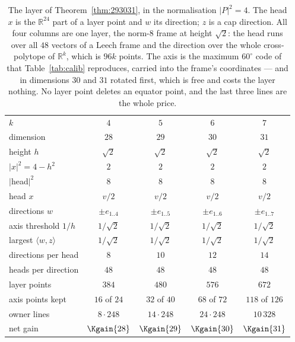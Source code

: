 \documentclass[11pt]{amsart}
\theoremstyle{remark}
\newcommand{\ip}[2]{\langle #1,#2\rangle}
\newcommand{\R}{\mathbb{R}}
\begin{document}
\begin{table}[ht]
\caption{The layer of Theorem~\ref{thm:293031}, in the normalisation
$|P|^{2}=4$. The head $x$ is the $\R^{24}$ part of a layer point and $w$ its
direction; $z$ is a cap direction. All four columns are one layer, the norm-$8$
frame at height $\sqrt2$: the head runs over all $48$ vectors of a Leech frame
and the direction over the whole cross-polytope of $\R^{k}$, which is $96k$
points. The axis is the maximum $60^{\circ}$ code of \cite{ma-etal2025} that
Table~\ref{tab:calib} reproduces, carried into the frame's coordinates --- and in
dimensions $30$ and $31$ rotated first, which is free and costs the layer
nothing. No layer point deletes an equator point, and the last three lines are
the whole price.}
\label{tab:layers}
\small\setlength{\tabcolsep}{5pt}
\begin{tabular}{lcccc}
\toprule
$k$ & $4$ & $5$ & $6$ & $7$\\
dimension & $28$ & $29$ & $30$ & $31$\\
\midrule
height $h$ & $\sqrt2$ & $\sqrt2$ & $\sqrt2$ & $\sqrt2$\\
$|x|^{2}=4-h^{2}$ & $2$ & $2$ & $2$ & $2$\\
$|$head$|^{2}$ & $8$ & $8$ & $8$ & $8$\\
head $x$ & $v/2$ & $v/2$ & $v/2$ & $v/2$\\
directions $w$ & $\pm e_{1..4}$ & $\pm e_{1..5}$ & $\pm e_{1..6}$ & $\pm e_{1..7}$\\
axis threshold $1/h$ & $1/\sqrt2$ & $1/\sqrt2$ & $1/\sqrt2$ & $1/\sqrt2$\\
largest $\ip{w}{z}$ & $1/\sqrt2$ & $1/\sqrt2$ & $1/\sqrt2$ & $1/\sqrt2$\\
directions per head & $8$ & $10$ & $12$ & $14$\\
heads per direction & $48$ & $48$ & $48$ & $48$\\
layer points & $384$ & $480$ & $576$ & $672$\\
\midrule
axis points kept & $16$ of $24$ & $32$ of $40$ & $68$ of $72$ & $118$ of $126$\\
owner lines & $8\cdot248$ & $14\cdot248$ & $24\cdot248$ & $10\,328$\\
net gain & $\Kgain{28}$ & $\Kgain{29}$ & $\Kgain{30}$ & $\Kgain{31}$\\
\bottomrule
\end{tabular}
\end{table}
\end{document}

